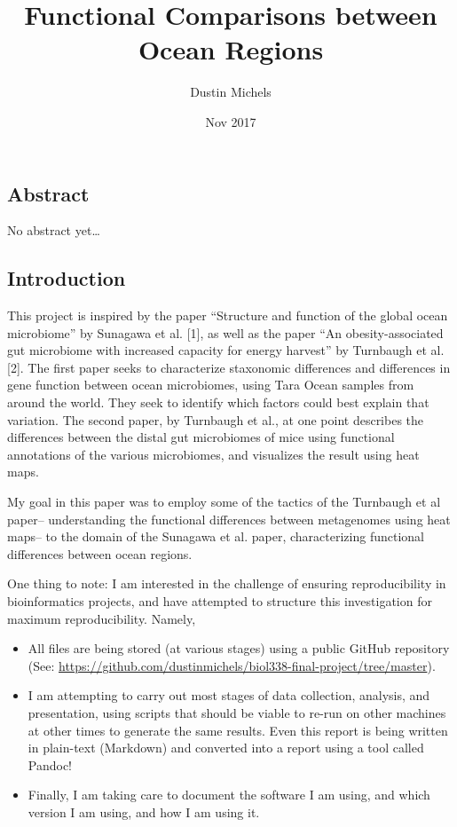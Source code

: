 \documentclass[12pt,a4paper,twocolumn]{article}
\title{Functional Comparisons between Ocean Regions}
\author{Dustin Michels}
\date{Nov 2017}
\providecommand{\tightlist}{%
  \setlength{\itemsep}{0pt}\setlength{\parskip}{0pt}}
\begin{document}
\maketitle

\listoffigures
\subsection{Abstract}\label{abstract}

No abstract yet\ldots{}

\subsection{Introduction}\label{introduction}

This project is inspired by the paper ``Structure and function of the
global ocean microbiome'' by Sunagawa et al. {[}1{]}, as well as the
paper ``An obesity-associated gut microbiome with increased capacity for
energy harvest'' by Turnbaugh et al. {[}2{]}. The first paper seeks to
characterize staxonomic differences and differences in gene function
between ocean microbiomes, using Tara Ocean samples from around the
world. They seek to identify which factors could best explain that
variation. The second paper, by Turnbaugh et al., at one point describes
the differences between the distal gut microbiomes of mice using
functional annotations of the various microbiomes, and visualizes the
result using heat maps.

My goal in this paper was to employ some of the tactics of the Turnbaugh
et al paper-- understanding the functional differences between
metagenomes using heat maps-- to the domain of the Sunagawa et al.
paper, characterizing functional differences between ocean regions.

One thing to note: I am interested in the challenge of ensuring
reproducibility in bioinformatics projects, and have attempted to
structure this investigation for maximum reproducibility. Namely,

\begin{itemize}
\tightlist
\item
  All files are being stored (at various stages) using a public GitHub
  repository (See:
  \url{https://github.com/dustinmichels/biol338-final-project/tree/master}).
\item
  I am attempting to carry out most stages of data collection, analysis,
  and presentation, using scripts that should be viable to re-run on
  other machines at other times to generate the same results. Even this
  report is being written in plain-text (Markdown) and converted into a
  report using a tool called Pandoc!
\item
  Finally, I am taking care to document the software I am using, and
  which version I am using, and how I am using it.
\end{itemize}
\end{document}
